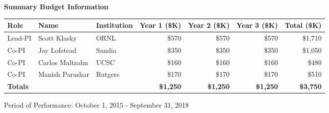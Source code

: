 
\vfill
\begin{center}
\textbf{\large Summary Budget Information}
\medskip
\begin{tabular}{| l | l | l | r | r | r | r |} \hline
Role & Name & Institution & Year 1 (\$K) & Year 2 (\$K) &   Year 3 (\$K) & Total (\$K) \\
\hline
Lead-PI & Scott Klasky & ORNL & {\$}570 &  {\$}570 &  {\$}570 &   {\$}1,710\\
Co-PI & Jay Lofstead & Sandia  &  {\$}350 &  {\$}350 &  {\$}350 &  {\$}1,050 \\
Co-PI & Carlos  Maltzahn & UCSC  &  {\$}160 &  {\$}160 &  {\$}160 &  {\$}480 \\
Co-PI & Manish Parashar & Rutgers &  {\$}170 &  {\$}170 &  {\$}170 &  {\$}510  \\
\hline
{\bf Totals}  & & & {\bf  {\$}1,250} & {\bf  {\$}1,250} & {\bf  {\$}1,250} & {\bf  {\$}3,750}\\
\hline
\end{tabular}
\end{center}

\noindent
{Period of Performance: October 1, 2015 - September 31, 2018}\\
\noindent
\vfill
